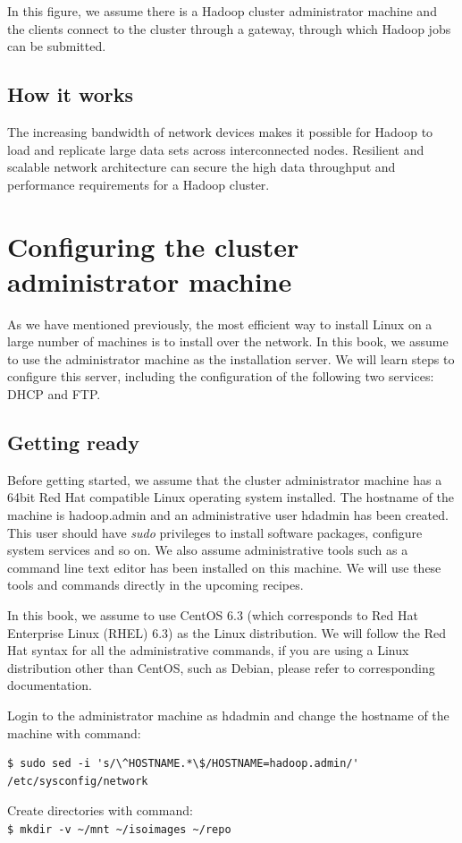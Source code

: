 In this figure, we assume there is a Hadoop cluster administrator machine and the clients connect to the cluster through a gateway, through which Hadoop jobs can be submitted.
\subsection*{How it works}
The increasing bandwidth of network devices makes it possible for Hadoop to load and replicate large data sets across interconnected nodes. Resilient and scalable network architecture can secure the high data throughput and performance requirements for a Hadoop cluster.

\section{Configuring the cluster administrator machine}
As we have mentioned previously, the most efficient way to install Linux on a large number of machines is to install over the network. In this book, we assume to use the administrator machine as the installation server. We will learn steps to configure this server, including the configuration of the following two services: DHCP and FTP.

\subsection*{Getting ready}
Before getting started, we assume that the cluster administrator machine has a 64bit Red Hat compatible Linux operating system installed. The hostname of the machine is hadoop.admin and an administrative user hdadmin has been created. This user should have \emph{sudo} privileges to install software packages, configure system services and so on. We also assume administrative tools such as a command line text editor has been installed on this machine. We will use these tools and commands directly in the upcoming recipes.

In this book, we assume to use CentOS 6.3 (which corresponds to Red Hat Enterprise Linux (RHEL) 6.3) as the Linux distribution. We will follow the Red Hat syntax for all the administrative commands, if you are using a Linux distribution other than CentOS, such as Debian, please refer to corresponding documentation.

Login to the administrator machine as hdadmin and change the hostname of the machine with command:
\lstset{style=bashstyle}
\begin{lstlisting}
$ sudo sed -i 's/\^HOSTNAME.*\$/HOSTNAME=hadoop.admin/' /etc/sysconfig/network
\end{lstlisting}
Create directories with command: \\
\verb|$ mkdir -v ~/mnt ~/isoimages ~/repo|


